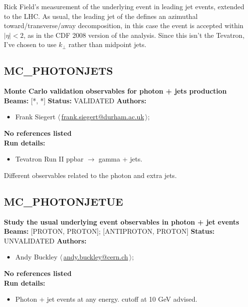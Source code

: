 \noindent Rick Field's measurement of the underlying event in leading jet events, extended to the LHC. As usual, the leading jet of the defines an azimuthal toward/transverse/away decomposition, in this case the event is accepted within $|\eta| < 2$, as in the CDF 2008 version of the analysis. Since this isn't the Tevatron, I've chosen to use $k_\perp$ rather than midpoint jets.

\clearpage


\clearpage

\subsection{MC\_PHOTONJETS}
\textbf{Monte Carlo validation observables for photon + jets production}\newline
\textbf{Beams:} [*, *] \newline
\textbf{Status:} VALIDATED\newline
\textbf{Authors:}
\begin{itemize}
  \item Frank Siegert $\langle\,$\href{mailto:frank.siegert@durham.ac.uk}{frank.siegert@durham.ac.uk}$\,\rangle$;
\end{itemize}
\textbf{No references listed}\\ 
\textbf{Run details:}
\begin{itemize}

  \item Tevatron Run II ppbar \ensuremath{\to} gamma + jets.\end{itemize}

\noindent Different observables related to the photon and extra jets.

\clearpage


\clearpage

\subsection{MC\_PHOTONJETUE}
\textbf{Study the usual underlying event observables in photon + jet events}\newline
\textbf{Beams:} [PROTON, PROTON]; [ANTIPROTON, PROTON] \newline
\textbf{Status:} UNVALIDATED\newline
\textbf{Authors:}
\begin{itemize}
  \item Andy Buckley $\langle\,$\href{mailto:andy.buckley@cern.ch}{andy.buckley@cern.ch}$\,\rangle$;
\end{itemize}
\textbf{No references listed}\\ 
\textbf{Run details:}
\begin{itemize}

  \item Photon + jet events at any energy. \pT cutoff at 10 GeV advised.\end{itemize}

